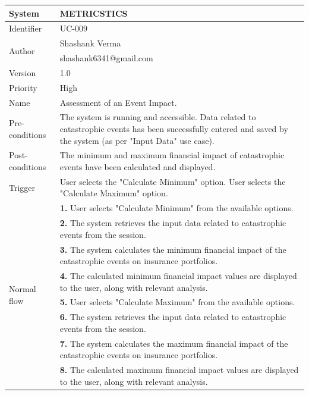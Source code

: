 \begin{table}[htb]
    \centering
     \begin{tabular}{|p{4cm}|p{12cm}|} \hline 
         System &  METRICSTICS\\ \hline 
         
         Identifier & UC-009 \\ \hline 
         
         \multirow{2}{*}{Author} & Shashank Verma   \\
         &shashank6341@gmail.com \\
           \hline 
           Version & 1.0\\ \hline
         
         Priority &  High\\ \hline 
         
         Name & Assessment of an Event Impact. \\ \hline 
         Pre-conditions & The system is running and accessible.
Data related to catastrophic events has been successfully entered and saved by the system (as per "Input Data" use case). \\ \hline 
         Post-conditions & The minimum and maximum financial impact of catastrophic events have been calculated and displayed.  \\ \hline
         Trigger & User selects the "Calculate Minimum" option. User selects the "Calculate Maximum" option. \\ \hline
        \multirow{8}{*}{Normal flow} 
        & \textbf{1.} User selects "Calculate Minimum" from the available options. \\ 
        & \textbf{2.} The system retrieves the input data related to catastrophic events from the session.   \\ 
 & \textbf{3.} The system calculates the minimum financial impact of the catastrophic events on insurance portfolios. \\ 
 & \textbf{4.} The calculated minimum financial impact values are displayed to the user, along with relevant analysis. \\ 
        & \textbf{5.} User selects "Calculate Maximum" from the available options.  \\ 
 & \textbf{6.}  The system retrieves the input data related to catastrophic events from the session. \\ 
 & \textbf{7.} The system calculates the maximum financial impact of the catastrophic events on insurance portfolios. \\ 
        & \textbf{8.} The calculated maximum financial impact values are displayed to the user, along with relevant analysis.   \\ 


\end{tabular}
\end{table}
